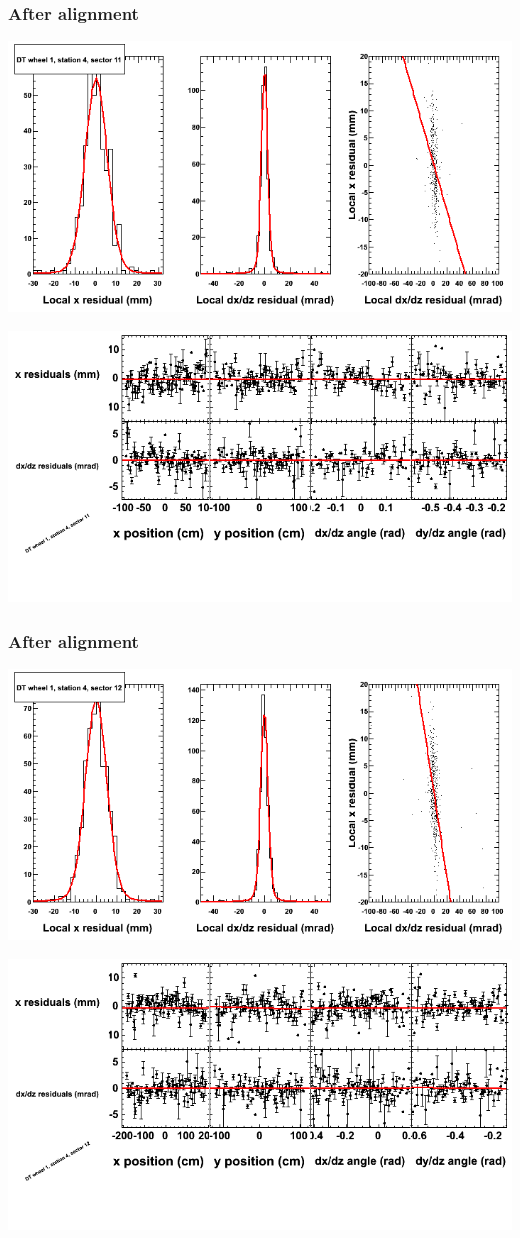 \documentclass[compress]{beamer}
\begin{document}
\begin{frame}
\frametitle{After alignment}
\includegraphics[width=0.7\linewidth]{NOV4_fitfunctions/MBwhDst4sec11_bellcurves.png}

\includegraphics[width=0.7\linewidth]{NOV4_fitfunctions/MBwhDst4sec11_polynomials.png}
\end{frame}

\begin{frame}
\frametitle{After alignment}
\includegraphics[width=0.7\linewidth]{NOV4_fitfunctions/MBwhDst4sec12_bellcurves.png}

\includegraphics[width=0.7\linewidth]{NOV4_fitfunctions/MBwhDst4sec12_polynomials.png}
\end{frame}
\end{document}
